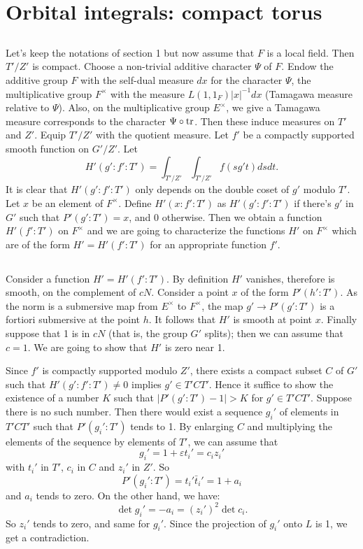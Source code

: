 \section{Orbital integrals: compact torus}

\subsection{}
Let's keep the notations of section 1 but now assume that $F$ is a local field.
Then $T'/Z'$ is compact.
Choose a non-trivial additive character $\Psi$ of $F$.
Endow the additive group $F$ with the self-dual measure $dx$ for the character $\Psi$, the multiplicative group $F^\times$ with the measure $L(1, 1_F)|x|^{-1} dx$ (Tamagawa measure relative to $\Psi$).
Also, on the multiplicative group $E^\times$, we give a Tamagawa measure corresponds to the character $\Psi \circ \mathrm{tr}$.
Then these induce measures on $T'$ and $Z'$.
Equip $T'/Z'$ with the quotient measure.
Let $f'$ be a compactly supported smooth function on $G'/Z'$.
Let
\begin{equation}
H'(g':f':T') = \int_{T'/Z'} \int_{T'/Z'} f(sg't) dsdt.
\end{equation}
It is clear that $H'(g':f':T')$ only depends on the double coset of $g'$ modulo $T'$.
Let $x$ be an element of $F^\times$.
Define $H'(x:f':T')$ as $H'(g':f':T')$ if there's $g'$ in $G'$ such that $P'(g':T') = x$, and 0 otherwise.
Then we obtain a function $H'(f':T')$ on $F^\times$ and we are going to characterize the functions $H'$ on $F^\times$ which are of the form $H' = H'(f': T')$ for an appropriate function $f'$.

\subsection{}
Consider a function $H' = H'(f':T')$.
By definition $H'$ vanishes, therefore is smooth, on the complement of $cN$.
Consider a point $x$ of the form $P'(h':T')$.
As the norm is a submersive map from $E^\times$ to $F^\times$, the map $g' \to P'(g':T')$ is a fortiori submersive at the point $h$.
It follows that $H'$ is smooth at point $x$.
Finally suppose that 1 is in $cN$ (that is, the group $G'$ splits); then we can assume that $c = 1$.
We are going to show that $H'$ is zero near 1.

Since $f'$ is compactly supported modulo $Z'$, there exists a compact subset $C$ of $G'$ such that $H'(g':f':T') \neq 0$ implies $g' \in T'CT'$.
Hence it suffice to show the existence of a number $K$ such that  $|P'(g':T') - 1|>K$ for $g' \in T'CT'$.
Suppose there is no such number.
Then there would exist a sequence $g_i'$ of elements in $T'CT'$ such that $P'(g_i':T')$ tends to 1.
By enlarging $C$ and multiplying the elements of the sequence by elements of $T'$, we can assume that
\[
g_i' = 1 + \varepsilon t_i' = c_i z_i'
\]
with $t_i'$ in $T'$, $c_i$ in $C$ and $z_i'$ in $Z'$. So
\[
P'(g_i':T') = t_i' \bar{t}_i' = 1 + a_i
\]
and $a_i$ tends to zero.
On the other hand, we have:
\[
\det g_i' = -a_i = {(z_i')}^2 \det c_i.
\]
So $z_i'$ tends to zero, and same for $g_i'$.
Since the projection of $g_i'$ onto $L$ is 1, we get a contradiction.

